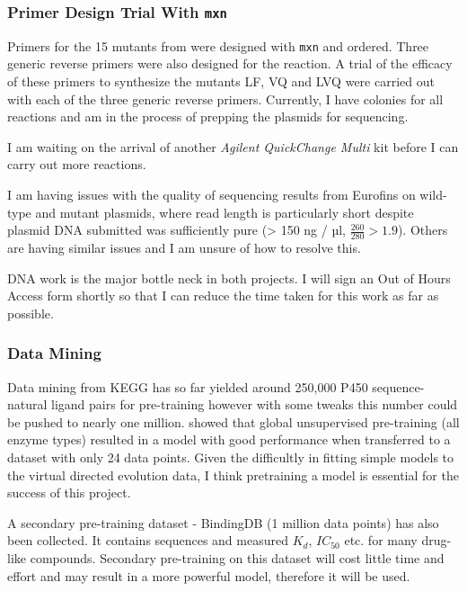 \documentclass{article}
\begin{document}
\subsubsection{Primer Design Trial With \texttt{mxn}} \label{mxn}
Primers for the 15 mutants from \cite{whitehouse2012p450} were designed with \texttt{mxn} and ordered. Three generic reverse primers were also designed for the reaction. A trial of the efficacy of these primers to synthesize the mutants LF, VQ and LVQ were carried out with each of the three generic reverse primers. Currently, I have colonies for all reactions and am in the process of prepping the plasmids for sequencing. 
\par
I am waiting on the arrival of another \textit{Agilent QuickChange Multi} kit before I can carry out more reactions.
\par
I am having issues with the quality of sequencing results from Eurofins on wild-type and mutant plasmids, where read length is particularly short despite plasmid DNA submitted was sufficiently pure (> 150 ng / µl, $\frac{260}{280} > 1.9$). Others are having similar issues and I am unsure of how to resolve this.
\par 
DNA work is the major bottle neck in both projects. I will sign an Out of Hours Access form shortly so that I can reduce the time taken for this work as far as possible.

\subsubsection{Data Mining}
\par
Data mining from KEGG has so far yielded around 250,000 P450 sequence-natural ligand pairs for pre-training however with some tweaks this number could be pushed to nearly one million. \cite{biswas2021low} showed that global unsupervised pre-training (all enzyme types) resulted in a model with good performance when transferred to a dataset with only 24 data points. Given the difficultly in fitting simple models to the virtual directed evolution data, I think pretraining a model is essential for the success of this project.
\par
A secondary pre-training dataset - BindingDB (1 million data points) has also been collected. It contains sequences and measured $K_d$, $IC_{50}$ etc. for many drug-like compounds. Secondary pre-training on this dataset will cost little time and effort and may result in a more powerful model, therefore it will be used.
\par 
\end{document}
